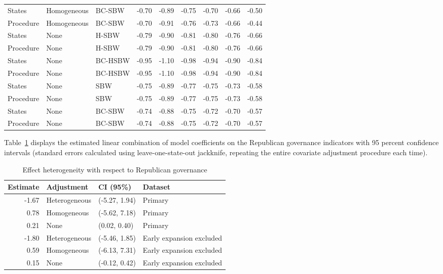 \begin{table}[h!]
\begin{tabular}{lllrrrrrr}
  States & Homogeneous & BC-SBW & -0.70 & -0.89 & -0.75 & -0.70 & -0.66 & -0.50 \\ 
  Procedure & Homogeneous & BC-SBW & -0.70 & -0.91 & -0.76 & -0.73 & -0.66 & -0.44 \\ 
  States & None & H-SBW & -0.79 & -0.90 & -0.81 & -0.80 & -0.76 & -0.66 \\ 
  Procedure & None & H-SBW & -0.79 & -0.90 & -0.81 & -0.80 & -0.76 & -0.66 \\ 
  States & None & BC-HSBW & -0.95 & -1.10 & -0.98 & -0.94 & -0.90 & -0.84 \\ 
  Procedure & None & BC-HSBW & -0.95 & -1.10 & -0.98 & -0.94 & -0.90 & -0.84 \\ 
  States & None & SBW & -0.75 & -0.89 & -0.77 & -0.75 & -0.73 & -0.58 \\ 
  Procedure & None & SBW & -0.75 & -0.89 & -0.77 & -0.75 & -0.73 & -0.58 \\ 
  States & None & BC-SBW & -0.74 & -0.88 & -0.75 & -0.72 & -0.70 & -0.57 \\ 
  Procedure & None & BC-SBW & -0.74 & -0.88 & -0.75 & -0.72 & -0.70 & -0.57 \\ 
   \hline
\end{tabular}
\end{table}

Table~\ref{tab:hte} displays the estimated linear combination of model coefficients on the Republican governance indicators with 95 percent confidence intervals (standard errors calculated using leave-one-state-out jackknife, repeating the entire covariate adjustment procedure each time). 

\begin{table}[h!]
\caption{Effect heterogeneity with respect to Republican governance}
\label{tab:hte}
\centering
\begin{tabular}{rlll}
  \hline
Estimate & Adjustment & CI (95\%) & Dataset \\ 
  \hline
-1.67 & Heterogeneous & (-5.27, 1.94) & Primary \\ 
  0.78 & Homogeneous & (-5.62, 7.18) & Primary \\ 
  0.21 & None & (0.02, 0.40) & Primary \\ 
  -1.80 & Heterogeneous & (-5.46, 1.85) & Early expansion excluded \\ 
  0.59 & Homogeneous & (-6.13, 7.31) & Early expansion excluded \\ 
  0.15 & None & (-0.12, 0.42) & Early expansion excluded \\ 
   \hline
\end{tabular}
\end{table}

\clearpage